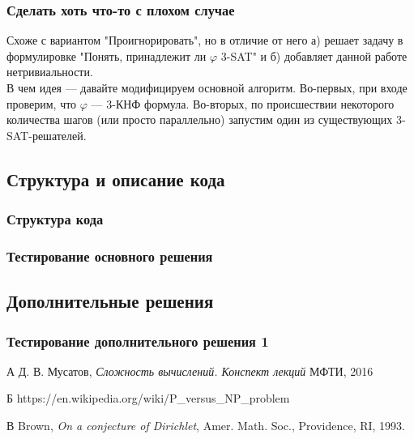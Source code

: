 \documentclass{amsart}
\theoremstyle{definition}
\theoremstyle{remark}
\numberwithin{equation}{section}
\begin{document}
\subsubsection{Сделать хоть что-то с плохом случае}

Схоже с вариантом "Проигнорировать", но в отличие от него а) решает задачу
в формулировке "Понять, принадлежит ли $\varphi$ 3-SAT" и б) добавляет данной
работе нетривиальности. \\

В чем идея --- давайте модифицируем основной алгоритм. Во-первых, при входе
проверим, что $\varphi$ --- 3-КНФ формула. Во-вторых, по происшествии некоторого
количества шагов (или просто параллельно) запустим один из
существующих 3-SAT-решателей.

\subsection{Структура и описание кода}

\subsubsection{Структура кода}

\subsubsection{Тестирование основного решения}

\subsection{Дополнительные решения}

\subsubsection{Тестирование дополнительного решения 1}







\begin{thebibliography}{10}

\bibitem [1] А Д. В. Мусатов, \textit{Сложность вычислений. Конспект лекций}
МФТИ, 2016

\bibitem [2] Б https://en.wikipedia.org/wiki/P\_versus\_NP\_problem

\bibitem [3] В Brown, \textit{On a conjecture of Dirichlet},
Amer. Math. Soc., Providence, RI, 1993.

\end{thebibliography}
\end{document}
